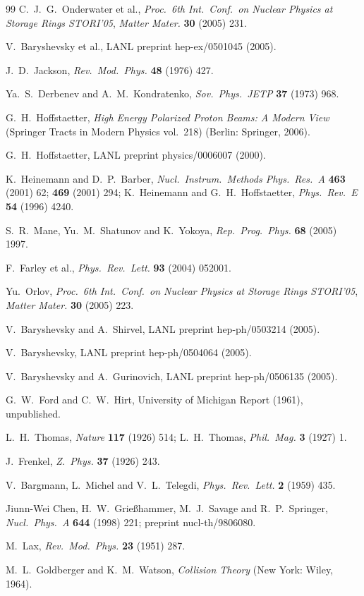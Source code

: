 \documentclass[11pt,a4paper]{article}
\begin{document}
\begin{thebibliography}{99}
C.~J.~G.~Onderwater et al., \textit{Proc.\ 6th Int.\ Conf.\ on Nuclear Physics at Storage Rings STORI'05},
\textit{Matter Mater.} \textbf{30} (2005) 231.

V.~Baryshevsky et al., LANL preprint hep-ex/0501045 (2005).

J.~D.~Jackson, \textit{Rev.\ Mod.\ Phys.} \textbf{48} (1976) 427.

Ya.~S.~Derbenev and A.~M.~Kondratenko, \textit{Sov.\ Phys.\ JETP} \textbf{37} (1973) 968.

G.~H.~Hoffstaetter, \textit{High Energy Polarized Proton Beams: A Modern View}
(Springer Tracts in Modern Physics vol.~218) (Berlin: Springer, 2006).

G.~H.~Hoffstaetter, LANL preprint physics/0006007 (2000).

K.~Heinemann and D.~P.~Barber, \textit{Nucl.\ Instrum.\ Methods Phys.\ Res.\ A}
\textbf{463} (2001) 62; \textbf{469} (2001) 294;
K.~Heinemann and G.~H.~Hoffstaetter, \textit{Phys.\ Rev.\ E} \textbf{54} (1996) 4240.

S.~R.~Mane, Yu.~M.~Shatunov and K.~Yokoya, \textit{Rep.\ Prog.\ Phys.} \textbf{68} (2005) 1997.

F.~Farley et al., \textit{Phys.\ Rev.\ Lett.} \textbf{93} (2004) 052001.

Yu.~Orlov, \textit{Proc.\ 6th Int.\ Conf.\ on Nuclear Physics at Storage Rings STORI'05},
\textit{Matter Mater.} \textbf{30} (2005) 223.

V.~Baryshevsky and A.~Shirvel, LANL preprint hep-ph/0503214 (2005).

V.~Baryshevsky, LANL preprint hep-ph/0504064 (2005).

V.~Baryshevsky and A.~Gurinovich, LANL preprint hep-ph/0506135 (2005).

G.~W.~Ford and C.~W.~Hirt, University of Michigan Report (1961), unpublished.

L.~H.~Thomas, \textit{Nature} \textbf{117} (1926) 514;
L.~H.~Thomas, \textit{Phil.\ Mag.} \textbf{3} (1927) 1.

J.~Frenkel, \textit{Z.\ Phys.} \textbf{37} (1926) 243.

V.~Bargmann, L.~Michel and V.~L.~Telegdi, \textit{Phys.\ Rev.\ Lett.} \textbf{2} (1959) 435.

Jiunn-Wei Chen, H.~W.~Grie{\ss}hammer, M.~J.~Savage and R.~P.~Springer,
\textit{Nucl.\ Phys.\ A} \textbf{644} (1998) 221; preprint nucl-th/9806080.

M.~Lax, \textit{Rev.\ Mod.\ Phys.} \textbf{23} (1951) 287.

M.~L.~Goldberger and K.~M.~Watson, \textit{Collision Theory} (New York: Wiley, 1964).

\end{thebibliography}
\end{document}
